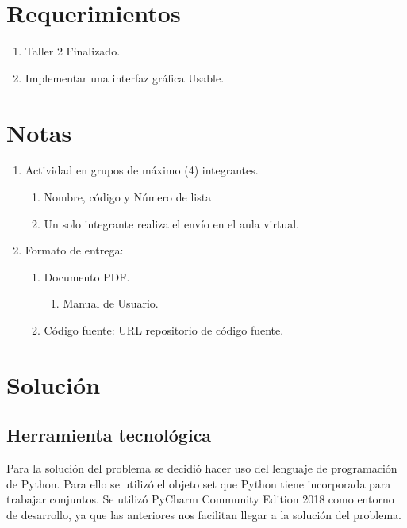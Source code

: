 \documentclass[a4paper,12pt]{article}
\begin{document}
{\newpage


\tableofcontents

\newpage



\section{Requerimientos}
\begin{enumerate}
\item Taller 2 Finalizado.
\item Implementar una interfaz gráfica Usable.
\end{enumerate}

\section{Notas}

\begin{enumerate}
\item Actividad en grupos de máximo (4)  integrantes.
\begin{enumerate}
\item Nombre, código y Número de lista
\item Un solo integrante realiza el envío en el aula virtual.
\end{enumerate}
\item Formato de entrega: 
\begin{enumerate}
\item Documento PDF.
\begin{enumerate}
\item Manual de Usuario.
\end{enumerate}
\item Código fuente: URL repositorio de código fuente.
\end{enumerate}
\end{enumerate}

\section{Solución}

\subsection{Herramienta tecnológica}
Para la solución del problema se decidió hacer uso del lenguaje de programación de Python. Para ello se utilizó el objeto set que Python tiene incorporada para trabajar conjuntos. Se utilizó PyCharm Community Edition 2018 como entorno de desarrollo, ya que las anteriores nos facilitan llegar a la solución del problema. 


}
\end{document}
